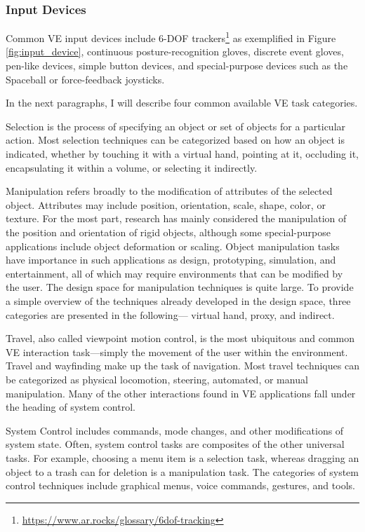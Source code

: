 \subsubsection{Input Devices}
\label{sec:input_devices}

Common \gls{VE} input devices include \gls{6-DOF} trackers\footnote{\url{https://www.ar.rocks/glossary/6dof-tracking}} as exemplified in Figure \ref{fig:input_device}, continuous posture-recognition gloves, discrete 
event gloves, pen-like devices, simple button devices, and special-purpose devices such as the 
Spaceball or force-feedback joysticks. 

In the next paragraphs, I will describe four common available VE task categories.

Selection is the process of specifying an object or set of objects for a particular action. 
Most selection techniques can be categorized based on how an object is indicated, whether
by touching it with a virtual hand, pointing at it, occluding it, encapsulating it within a volume, or 
selecting it indirectly.

Manipulation refers broadly to the  modification of 
attributes of the selected object. Attributes may include position, orientation, scale, shape, color, 
or texture. For the most part, research has mainly considered the manipulation of the  position 
and orientation of rigid objects, although some special-purpose applications include object deformation or scaling. Object manipulation tasks have importance in such applications as design, 
prototyping, simulation, and entertainment, all of which may require environments that can be 
modified by the user. The design space for manipulation techniques is quite large. To provide a simple overview of the 
techniques already developed in the design space, three categories are presented in the following—
virtual hand, proxy, and indirect. 

Travel, also called viewpoint motion control, is the most ubiquitous and common \gls{VE} interaction 
task—simply the movement of the user within the environment. Travel and wayfinding make up the task of navigation. 
Most travel techniques can be categorized as physical locomotion, steering, automated, or manual manipulation. 
Many of the other interactions found in VE applications fall under the heading of system control. 

System Control includes commands, mode changes, and other modifications of system state. 
Often, system control tasks are composites of the other universal tasks. For example, choosing
a menu item is a selection task, whereas dragging an object to a trash can for deletion is a 
manipulation task. The categories of system control techniques include graphical 
menus, voice commands, gestures, and tools.


